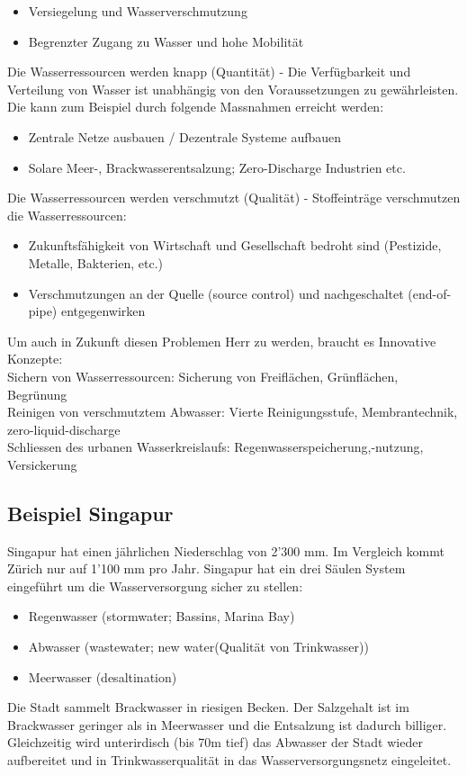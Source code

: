 \documentclass[9pt, openright=false]{scrartcl}
\begin{document}
\begin{itemize}
\item Versiegelung und Wasserverschmutzung
\item Begrenzter Zugang zu Wasser und hohe Mobilität
\end{itemize}
Die Wasserressourcen werden knapp (Quantität) - Die Verfügbarkeit und Verteilung von Wasser ist unabhängig von den Voraussetzungen zu gewährleisten. Die kann zum Beispiel durch folgende Massnahmen erreicht werden:
\begin{itemize}
\item Zentrale Netze ausbauen / Dezentrale Systeme aufbauen
\item Solare Meer-, Brackwasserentsalzung; Zero-Discharge Industrien etc.
\end{itemize}
Die Wasserressourcen werden verschmutzt (Qualität) - Stoffeinträge verschmutzen die Wasserressourcen:
\begin{itemize}
\item Zukunftsfähigkeit von Wirtschaft und Gesellschaft bedroht sind (Pestizide, Metalle, Bakterien, etc.)
\item Verschmutzungen an der Quelle (source control) und nachgeschaltet (end-of-pipe)
entgegenwirken
\end{itemize}
Um auch in Zukunft diesen Problemen Herr zu werden, braucht es Innovative Konzepte: \\
Sichern von Wasserressourcen: Sicherung von Freiflächen, Grünflächen, Begrünung\\
Reinigen von verschmutztem Abwasser: Vierte Reinigungsstufe, Membrantechnik, zero-liquid-discharge\\
Schliessen des urbanen Wasserkreislaufs: Regenwasserspeicherung,-nutzung, Versickerung
\subsection{Beispiel Singapur}
Singapur hat einen jährlichen Niederschlag von 2'300 mm. Im Vergleich kommt Zürich nur auf 1'100 mm pro Jahr. Singapur hat ein drei Säulen System eingeführt um die Wasserversorgung sicher zu stellen:
\begin{itemize}
\item Regenwasser (stormwater; Bassins, Marina Bay)
\item Abwasser (wastewater; \glqq new water\grqq (Qualität von Trinkwasser))
\item Meerwasser (desaltination)
\end{itemize}
Die Stadt sammelt Brackwasser in riesigen Becken. Der Salzgehalt ist im Brackwasser geringer als in Meerwasser und die Entsalzung ist dadurch billiger. Gleichzeitig wird unterirdisch (bis 70m tief) das Abwasser der Stadt wieder aufbereitet und in Trinkwasserqualität in das Wasserversorgungsnetz eingeleitet.
\end{document}
